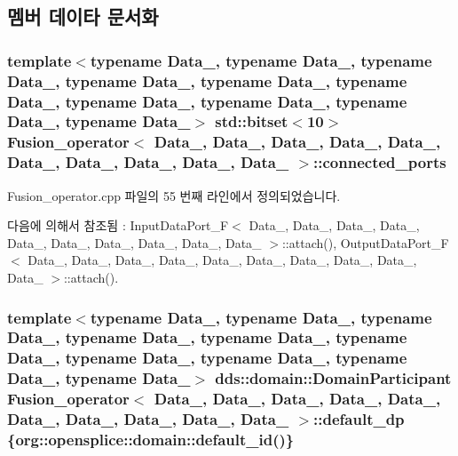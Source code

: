 \subsection{멤버 데이타 문서화}
\subsubsection[{\texorpdfstring{connected\+\_\+ports}{connected_ports}}]{\setlength{\rightskip}{0pt plus 5cm}template$<$typename Data\+\_, typename Data\+\_, typename Data\+\_, typename Data\+\_, typename Data\+\_, typename Data\+\_, typename Data\+\_, typename Data\+\_, typename Data\+\_, typename Data\+\_$>$ std\+::bitset$<$10$>$ {\bf Fusion\+\_\+operator}$<$ Data\+\_, Data\+\_, Data\+\_, Data\+\_, Data\+\_, Data\+\_, Data\+\_, Data\+\_, Data\+\_, Data\+\_ $>$\+::connected\+\_\+ports}\hypertarget{classFusion__operator_a5d5904ab66f3b43ed107a5b3ef9d205b}{}\label{classFusion__operator_a5d5904ab66f3b43ed107a5b3ef9d205b}


Fusion\+\_\+operator.\+cpp 파일의 55 번째 라인에서 정의되었습니다.



다음에 의해서 참조됨 \+:  Input\+Data\+Port\+\_\+\+F$<$ Data\+\_, Data\+\_, Data\+\_, Data\+\_, Data\+\_, Data\+\_, Data\+\_, Data\+\_, Data\+\_, Data\+\_ $>$\+::attach(), Output\+Data\+Port\+\_\+\+F$<$ Data\+\_, Data\+\_, Data\+\_, Data\+\_, Data\+\_, Data\+\_, Data\+\_, Data\+\_, Data\+\_, Data\+\_ $>$\+::attach().

\subsubsection[{\texorpdfstring{default\+\_\+dp}{default_dp}}]{\setlength{\rightskip}{0pt plus 5cm}template$<$typename Data\+\_, typename Data\+\_, typename Data\+\_, typename Data\+\_, typename Data\+\_, typename Data\+\_, typename Data\+\_, typename Data\+\_, typename Data\+\_, typename Data\+\_$>$ dds\+::domain\+::\+Domain\+Participant {\bf Fusion\+\_\+operator}$<$ Data\+\_, Data\+\_, Data\+\_, Data\+\_, Data\+\_, Data\+\_, Data\+\_, Data\+\_, Data\+\_, Data\+\_ $>$\+::default\+\_\+dp \{org\+::opensplice\+::domain\+::default\+\_\+id()\}}\hypertarget{classFusion__operator_ad3b3aafd9ed9aa55eb097656a97551bd}{}\label{classFusion__operator_ad3b3aafd9ed9aa55eb097656a97551bd}


